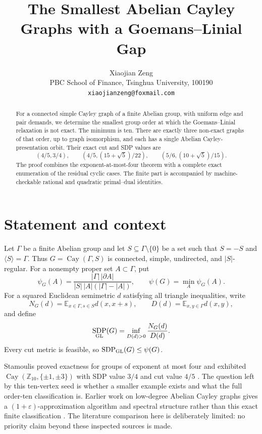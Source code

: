 \documentclass[11pt]{article}
\title{The Smallest Abelian Cayley Graphs with a Goemans--Linial Gap}
\author{Xiaojian Zeng\\
PBC School of Finance, Tsinghua University, 100190\\
\texttt{xiaojianzeng@foxmail.com}}
\date{}
\DeclareMathOperator{\Cay}{Cay}
\DeclareMathOperator{\SDP}{SDP}
\begin{document}
\maketitle

\begin{abstract}
For a connected simple Cayley graph of a finite Abelian group, with uniform
edge and pair demands, we determine the smallest group order at which the
Goemans--Linial relaxation is not exact.  The minimum is ten.  There are
exactly three non-exact graphs of that order, up to graph isomorphism, and
each has a single Abelian Cayley-presentation orbit.  Their exact cut and SDP
values are
\[
(4/5,3/4),\qquad (4/5,(15+\sqrt5)/22),\qquad
(5/6,(10+\sqrt5)/15).
\]
The proof combines the exponent-at-most-four theorem with a complete exact
enumeration of the residual cyclic cases.  The finite part is accompanied by
machine-checkable rational and quadratic primal--dual identities.
\end{abstract}

\section{Statement and context}

Let $\Gamma$ be a finite Abelian group and let
$S\subseteq\Gamma\setminus\{0\}$ be a set such that $S=-S$ and
$\langle S\rangle=\Gamma$.  Thus $G=\Cay(\Gamma,S)$ is connected, simple,
undirected, and $|S|$-regular.  For a nonempty proper set $A\subset\Gamma$,
put
\[
 \psi_G(A)=\frac{|\Gamma|\,|\partial A|}
 {|S|\,|A|(|\Gamma|-|A|)},\qquad
 \psi(G)=\min_A\psi_G(A).
\]
For a squared Euclidean semimetric $d$ satisfying all triangle inequalities,
write
\[
 N_G(d)=\mathbb E_{x\in\Gamma,s\in S}d(x,x+s),\qquad
 D(d)=\mathbb E_{x,y\in\Gamma}d(x,y),
\]
and define
\[
 \SDP_{\rm GL}(G)=\inf_{D(d)>0}\frac{N_G(d)}{D(d)}.
\]
Every cut metric is feasible, so $\SDP_{\rm GL}(G)\leq\psi(G)$.

Stamoulis proved exactness for groups of exponent at most four and exhibited
$\Cay(\mathbb Z_{10},\{\pm1,\pm3\})$ with SDP value $3/4$ and cut value
$4/5$ \cite[Corollary~4.7 and Section~6.4]{Stamoulis2026}.  The question left
by this ten-vertex seed is whether a smaller example exists and what the full
order-ten classification is.  Earlier work on low-degree Abelian Cayley
graphs gives a $(1+\varepsilon)$-approximation algorithm and spectral
structure rather than this exact finite classification
\cite{DorsiEtAl2025}.  The literature comparison here is deliberately
limited: no priority claim beyond these inspected sources is made.
\end{document}
